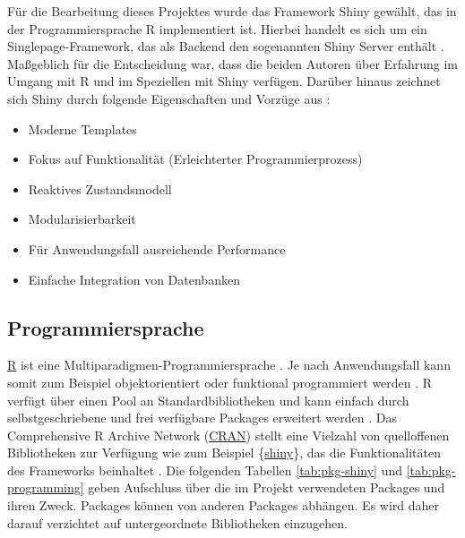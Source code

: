 \documentclass[
]{article}
\providecommand{\tightlist}{%
  \setlength{\itemsep}{0pt}\setlength{\parskip}{0pt}}
\begin{document}
Für die Bearbeitung dieses Projektes wurde das Framework Shiny gewählt, das in der Programmiersprache R implementiert ist. Hierbei handelt es sich um ein Singlepage-Framework, das als Backend den sogenannten Shiny Server enthält \autocite{Allen2020}. Maßgeblich für die Entscheidung war, dass die beiden Autoren über Erfahrung im Umgang mit R und im Speziellen mit Shiny verfügen. Darüber hinaus zeichnet sich Shiny durch folgende Eigenschaften und Vorzüge aus \autocite{Allen2020}:

\begin{itemize}
\tightlist
\item
  Moderne Templates
\item
  Fokus auf Funktionalität (Erleichterter Programmierprozess)
\item
  Reaktives Zustandsmodell
\item
  Modularisierbarkeit
\item
  Für Anwendungsfall ausreichende Performance
\item
  Einfache Integration von Datenbanken
\end{itemize}

\hypertarget{programmiersprache}{%
\subsection{Programmiersprache}\label{programmiersprache}}

\href{https://www.r-project.org/}{R} ist eine Multiparadigmen-Programmiersprache \autocite{Chambers2014}. Je nach Anwendungsfall kann somit zum Beispiel objektorientiert oder funktional programmiert werden \autocite{Chambers2014}. R verfügt über einen Pool an Standardbibliotheken und kann einfach durch selbstgeschriebene und frei verfügbare Packages erweitert werden \autocite{r_manual}. Das Comprehensive R Archive Network (\href{https://cran.r-project.org/}{CRAN}) stellt eine Vielzahl von quelloffenen Bibliotheken zur Verfügung wie zum Beispiel \{\href{https://shiny.rstudio.com/}{shiny}\}, das die Funktionalitäten des Frameworks beinhaltet \autocite{cran_faq}. Die folgenden Tabellen \ref{tab:pkg-shiny} und \ref{tab:pkg-programming} geben Aufschluss über die im Projekt verwendeten Packages und ihren Zweck. Packages können von anderen Packages abhängen. Es wird daher darauf verzichtet auf untergeordnete Bibliotheken einzugehen.
\end{document}
